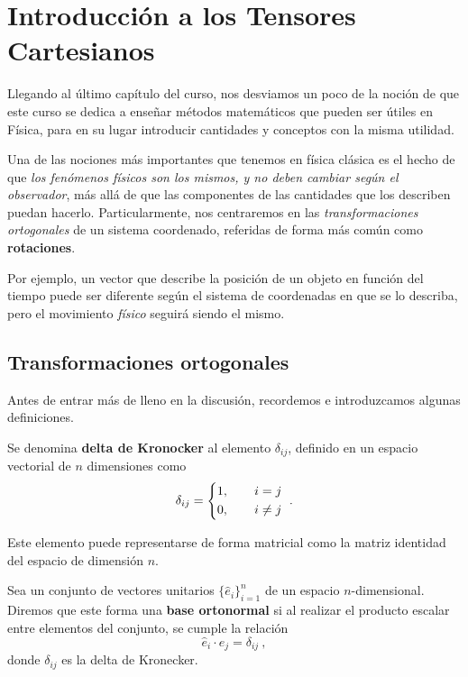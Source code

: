 \chapter{Introducción a los Tensores Cartesianos}

Llegando al último capítulo del curso, nos desviamos un poco de la noción de que este curso se dedica a enseñar métodos matemáticos que pueden ser útiles en Física, para en su lugar introducir cantidades y conceptos con la misma utilidad.

Una de las nociones más importantes que tenemos en física clásica es el hecho de que \emph{los fenómenos físicos son los mismos, y no deben cambiar según el observador}, más allá de que las componentes de las cantidades que los describen puedan hacerlo. Particularmente, nos centraremos en las \emph{transformaciones ortogonales} de un sistema coordenado, referidas de forma más común como \textbf{rotaciones}. 

Por ejemplo, un vector que describe la posición de un objeto en función del tiempo puede ser diferente según el sistema de coordenadas en que se lo describa, pero el movimiento \emph{físico} seguirá siendo el mismo.

\section{Transformaciones ortogonales}

Antes de entrar más de lleno en la discusión, recordemos e introduzcamos algunas definiciones.

\begin{defi}
    Se denomina \textbf{delta de Kronocker} al elemento $\delta_{ij}$, definido en un espacio vectorial de $n$ dimensiones como
    \begin{equation}
        \delta_{ij} = \begin{dcases}
            1, \qquad i = j \\
            0, \qquad i \neq j
        \end{dcases} \ .
    \end{equation} 

    Este elemento puede representarse de forma matricial como la matriz identidad del espacio de dimensión $n$.
\end{defi}

\begin{defi}
    Sea un conjunto de vectores unitarios $\{ \hat{e}_i\}_{i=1}^n$ de un espacio $n$-dimensional. Diremos que este forma una \textbf{base ortonormal} si al realizar el producto escalar entre elementos del conjunto, se cumple la relación
    \begin{equation}
        \hat{e}_i\cdot \hat{e}_j = \delta_{ij} \ ,
    \end{equation}
    donde $\delta_{ij}$ es la delta de Kronecker.
\end{defi}

